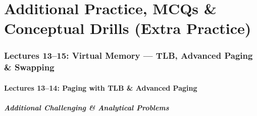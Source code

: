 \documentclass[11pt,a4paper]{article}
\begin{document}
\clearpage

\part{Additional Practice, MCQs \& Conceptual Drills (Extra Practice)}

\section{Lectures 13--15: Virtual Memory --- TLB, Advanced Paging \& Swapping}

\subsection{Lectures 13--14: Paging with TLB \& Advanced Paging}

\subsubsection*{Additional Challenging \& Analytical Problems}
\end{document}
